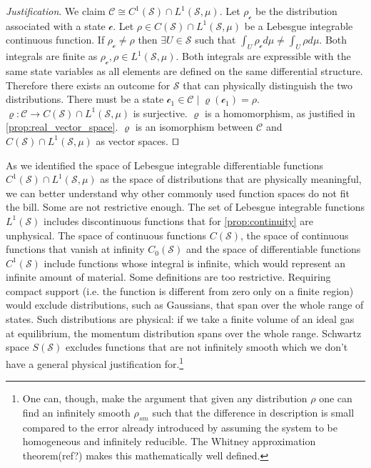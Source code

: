 \documentclass[smallextended]{svjour3}
\numberwithin{equation}{section}
\newenvironment{justification}{\emph{Justification}.}{\hfill\(\qed\)}
\begin{document}
\begin{justification}
	We claim $\mathcal{C} \cong C^1(\mathcal{S}) \cap L^1(\mathcal{S}, \mu)$. Let $\rho_\mathcal{c}$ be the distribution associated with a state $\mathcal{c}$. Let $\rho \in C(\mathcal{S}) \cap  L^1(\mathcal{S}, \mu)$ be a Lebesgue integrable continuous function. If $\rho_\mathcal{c} \neq \rho$ then $\exists U \in \mathcal{S}$ such that $\int_{U} \rho_\mathcal{c} d \mu \neq \int_{U} \rho d \mu$. Both integrals are finite as $\rho_\mathcal{c}, \rho \in L^1(\mathcal{S}, \mu)$. Both integrals are expressible with the same state variables as all elements are defined on the same differential structure. Therefore there exists an outcome for $\mathcal{S}$ that can physically distinguish the two distributions. There must be a state $\mathcal{c}_1 \in \mathcal{C} \; | \; \varrho(\mathcal{c}_1)=\rho$. $\varrho : \mathcal{C} \rightarrow C(\mathcal{S}) \cap  L^1(\mathcal{S}, \mu)$ is surjective. $\varrho$ is a homomorphism, as justified in \ref{prop:real_vector_space}. $\varrho$ is an isomorphism between $\mathcal{C}$ and $C(\mathcal{S}) \cap  L^1(\mathcal{S}, \mu)$ as vector spaces.
\end{justification}

As we identified the space of Lebesgue integrable differentiable functions $C^1(\mathcal{S}) \cap  L^1(\mathcal{S}, \mu)$ as the space of distributions that are physically meaningful, we can better understand why other commonly used function spaces do not fit the bill. Some are not restrictive enough. The set of Lebesgue integrable functions $L^1(\mathcal{S})$ includes discontinuous functions that for \ref{prop:continuity} are unphysical. The space of continuous functions $C(\mathcal{S})$, the space of continuous functions that vanish at infinity $C_0(\mathcal{S})$ and the space of differentiable functions $C^1(\mathcal{S})$ include functions whose integral is infinite, which would represent an infinite amount of material. Some definitions are too restrictive. Requiring compact support (i.e. the function is different from zero only on a finite region) would exclude distributions, such as Gaussians, that span over the whole range of states. Such distributions are physical: if we take a finite volume of an ideal gas at equilibrium, the momentum distribution spans over the whole range. Schwartz space $S(\mathcal{S})$ excludes functions that are not infinitely smooth which we don't have a general physical justification for.\footnote{One can, though, make the argument that given any distribution $\rho$ one can find an infinitely smooth $\rho_{sm}$ such that the difference in description is small compared to the error already introduced by assuming the system to be homogeneous and infinitely reducible. The Whitney approximation theorem(ref?) makes this mathematically well defined.}
\end{document}
